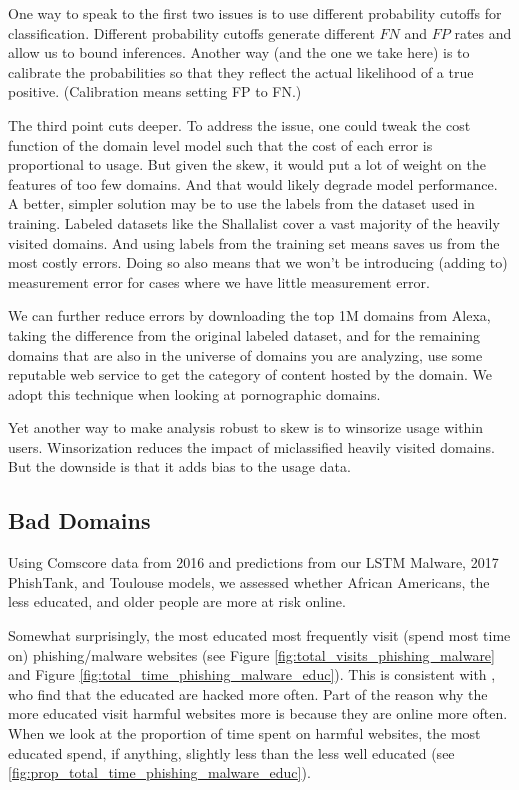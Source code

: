 \documentclass[12pt, letterpaper]{article}
\begin{document}
One way to speak to the first two issues is to use different probability cutoffs for classification. Different probability cutoffs generate different $FN$ and $FP$ rates and allow us to bound inferences. Another way (and the one we take here) is to calibrate the probabilities so that they reflect the actual likelihood of a true positive. (Calibration means setting FP to FN.)

The third point cuts deeper. To address the issue, one could tweak the cost function of the domain level model such that the cost of each error is proportional to usage. But given the skew, it would put a lot of weight on the features of too few domains. And that would likely degrade model performance. A better, simpler solution may be to use the labels from the dataset used in training. Labeled datasets like the Shallalist cover a vast majority of the heavily visited domains. And using labels from the training set means saves us from the most costly errors.  Doing so also means that we won't be introducing (adding to) measurement error for cases where we have little measurement error.

We can further reduce errors by downloading the top 1M domains from Alexa, taking the difference from the original labeled dataset, and for the remaining domains that are also in the universe of domains you are analyzing, use some reputable web service to get the category of content hosted by the domain. We adopt this technique when looking at pornographic domains.

Yet another way to make analysis robust to skew is to winsorize usage within users. Winsorization reduces the impact of miclassified heavily visited domains. But the downside is that it adds bias to the usage data.

\subsection{Bad Domains}
Using Comscore data from 2016 and predictions from our LSTM Malware, 2017 PhishTank, and Toulouse models, we assessed whether African Americans, the less educated, and older people are more at risk online.

Somewhat surprisingly, the most educated most frequently visit (spend most time on) phishing/malware websites (see Figure \ref{fig:total_visits_phishing_malware} and Figure \ref{fig:total_time_phishing_malware_educ}). This is consistent with \citep{cor2018pwned}, who find that the educated are hacked more often. Part of the reason why the more educated visit harmful websites more is because they are online more often. When we look at the proportion of time spent on harmful websites, the most educated spend, if anything, slightly less than the less well educated (see \ref{fig:prop_total_time_phishing_malware_educ}).
\end{document}
